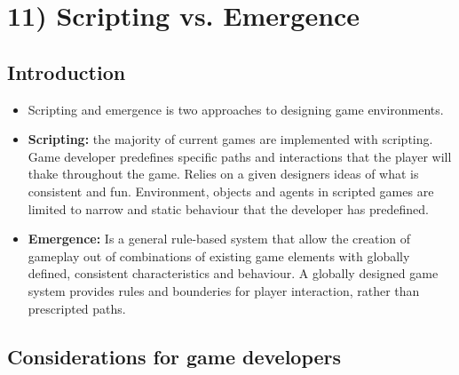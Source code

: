 \chapter*{11) Scripting vs. Emergence}

\section*{Introduction}

  \begin{itemize}
    \item Scripting and emergence is two approaches to designing game environments.
    \item {\bf Scripting:} the majority of current games are implemented with scripting. Game developer predefines specific paths and interactions that the player will thake throughout the game. Relies on a given designers ideas of what is consistent and fun. Environment, objects and agents in scripted games are limited to narrow and static behaviour that the developer has predefined. 
    \item {\bf Emergence:} Is a general rule-based system that allow the creation of gameplay out of combinations of existing game elements with globally defined, consistent characteristics and behaviour. A globally designed game system provides rules and bounderies for player interaction, rather than prescripted paths. 
  \end{itemize}

\section*{Considerations for game developers}

